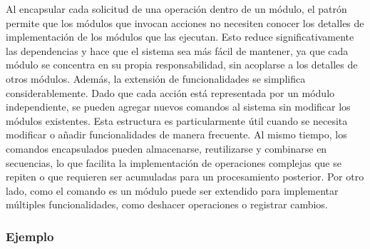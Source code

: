 Al encapsular cada solicitud de una operación dentro de un módulo, el patrón permite que los módulos que invocan acciones no necesiten conocer los detalles de implementación de los módulos que las ejecutan. Esto reduce significativamente las dependencias y hace que el sistema sea más fácil de mantener, ya que cada módulo se concentra en su propia responsabilidad, sin acoplarse a los detalles de otros módulos. Además, la extensión de funcionalidades se simplifica considerablemente. Dado que cada acción está representada por un módulo independiente, se pueden agregar nuevos comandos al sistema sin modificar los módulos existentes. Esta estructura es particularmente útil cuando se necesita modificar o añadir funcionalidades de manera frecuente. Al mismo tiempo, los comandos encapsulados pueden almacenarse, reutilizarse y combinarse en secuencias, lo que facilita la implementación de operaciones complejas que se repiten o que requieren ser acumuladas para un procesamiento posterior. Por otro lado, como el comando es un módulo puede ser extendido para implementar múltiples funcionalidades, como deshacer operaciones o registrar cambios. 

\subsubsection{Ejemplo}

